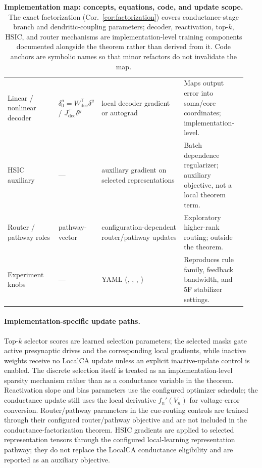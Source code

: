 \begin{table}[htbp]
\begin{tabular}{@{}L{0.21\linewidth}L{0.13\linewidth}L{0.34\linewidth}L{0.26\linewidth}@{}}
    Linear / nonlinear decoder & $\delta_0^a{=}W_{\mathrm{dec}}^{\!\top}\delta^y$ / $J_{\mathrm{dec}}^{\!\top}\delta^y$ & local decoder gradient or autograd & Maps output error into soma/core coordinates; implementation-level. \\
    HSIC auxiliary & --- & auxiliary gradient on selected representations & Batch dependence regularizer; auxiliary objective, not a local theorem term. \\
    Router / pathway roles & pathway-vector & configuration-dependent router/pathway updates & Exploratory higher-rank routing; outside the theorem. \\
    Experiment knobs & --- &  YAML (, , , ) & Reproduces rule family, feedback bandwidth, and 5F stabilizer settings. \\
    \bottomrule
    \end{tabular}
    \caption{\textbf{Implementation map: concepts, equations, code, and update scope.} The exact factorization (Cor.~\ref{cor:factorization}) covers conductance-stage branch and dendritic-coupling parameters; decoder, reactivation, top-$k$, HSIC, and router mechanisms are implementation-level training components documented alongside the theorem rather than derived from it. Code anchors are symbolic names so that minor refactors do not invalidate the map.}
    \label{tab:eq_code_map}
    \end{table}
    
    \paragraph{Implementation-specific update paths.}
    Top-$k$ selector scores are learned selection parameters; the selected masks gate active presynaptic drives and the corresponding local gradients, while inactive weights receive no LocalCA update unless an explicit inactive-update control is enabled. The discrete selection itself is treated as an implementation-level sparsity mechanism rather than as a conductance variable in the theorem. Reactivation slope and bias parameters use the configured optimizer schedule; the conductance update still uses the local derivative $f_n'(V_n)$ for voltage-error conversion. Router/pathway parameters in the cue-routing controls are trained through their configured router/pathway objective and are not included in the conductance-factorization theorem. HSIC gradients are applied to selected representation tensors through the configured local-learning representation pathway; they do not replace the LocalCA conductance eligibility and are reported as an auxiliary objective.
    
